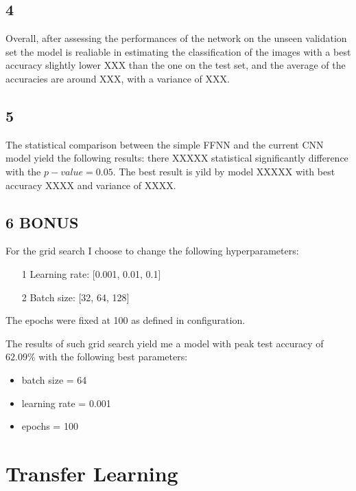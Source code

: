 \documentclass[11pt]{scrartcl}
\begin{document}
\subsection*{4}

Overall, after assessing the performances of the network on the unseen validation set
the model is realiable in estimating the classification of the images with
a best accuracy slightly lower XXX than the one on the test set,
and the average of the accuracies are around XXX,
with a variance of XXX.

\subsection*{5}

The statistical comparison between the simple FFNN and the current CNN model yield 
the following results:
there XXXXX statistical significantly difference with the \( p-value = 0.05 \).
The best result is yild by model XXXXX with best accuracy XXXX and variance of XXXX.

\subsection*{6 BONUS}

For the grid search I choose to change the following hyperparameters:
\begin{itemize}
	\item[1] Learning rate: [0.001, 0.01, 0.1]
	\item[2] Batch size: [32, 64, 128]
\end{itemize}

The epochs were fixed at 100 as defined in configuration.

The results of such grid search yield me a model with peak test accuracy of
\( 62.09 \% \)
with the following best parameters:

\begin{itemize}
	\item batch size = 64
	\item learning rate = 0.001
	\item epochs = 100
\end{itemize}


\newpage
\section{Transfer Learning}
\end{document}
